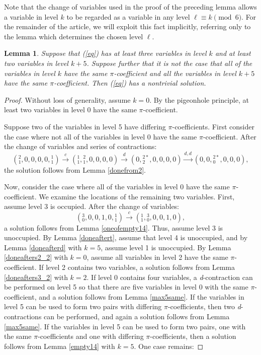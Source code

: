 \documentclass[draft]{publmathdeb}
\newtheorem{lemma}{Lemma}
\begin{document}
Note that the change of variables used in the proof of the preceding lemma allows a variable in level $k$ to be regarded as a variable in any level $\ell \equiv k \pmod{6}$.  For the remainder of the article, we will exploit this fact implicitly, referring only to the lemma which determines the chosen level $\ell$.

\begin{lemma}\label{3and2same}
Suppose that (\ref{eq}) has at least three variables in level $k$ and at least two variables in level $k+5$.  Suppose further that it is not the case that all of the variables in level $k$ have the same $\pi$-coefficient and all the variables in level $k+5$ have the same $\pi$-coefficient. Then (\ref{eq}) has a nontrivial solution.
\end{lemma}
\begin{proof}

Without loss of generality, assume $k=0$.  By the pigeonhole principle, at least two variables in level 0 have the same $\pi$-coefficient.

Suppose two of the variables in level 5 have differing $\pi$-coefficients. First consider the case where not all of the variables in level 0 have the same $\pi$-coefficient.  After the change of variables and series of contractions:
$$({}^{2}_{1},0,0,0,0,{}^{1}_{1}) \xrightarrow{c} ({}^{1}_{1},{}^{2}_{1},0,0,0,0) \xrightarrow{d} (0,{}^{2*}_{2},0,0,0,0) \xrightarrow{d,d} (0,0,{}^{2*}_{0},0,0,0),$$
the solution follows from Lemma \ref{donefrom2}.

Now, consider the case where all of the variables in level 0 have the same $\pi$-coefficient.  We examine the locations of the remaining two variables.  First, assume level 3 is occupied.  After the change of variables:
$$({}^{3}_{0},0,0,1,0,{}^{1}_{1}) \xrightarrow{c} ({}^{1}_{1},{}^{3}_{0},0,0,1,0),$$
a solution follows from Lemma \ref{oneofempty14}.  Thus, assume level 3 is unoccupied.  By Lemma \ref{doneaftert}, assume that level 4 is unoccupied, and by Lemma \ref{doneafterd} with $k=5$, assume level 1 is unoccupied.  By Lemma \ref{doneafters2_2} with $k=0$, assume all variables in level 2 have the same $\pi$-coefficient.  If level 2 contains two variables, a solution follows from Lemma \ref{doneafters3_2} with $k=2$.  If level 0 contains four variables, a \textit{d}-contraction can be performed on level 5 so that there are five variables in level 0 with the same $\pi$-coefficient, and a solution follows from Lemma \ref{max5same}.  If the variables in level 5 can be used to form two pairs with differing $\pi$-coefficients, then two \textit{d}-contractions can be performed, and again a solution follows from Lemma \ref{max5same}.  If the variables in level 5 can be used to form two pairs, one with the same $\pi$-coefficients and one with differing $\pi$-coefficients, then a solution follows from Lemma  \ref{empty14} with $k=5$.  One case remains:


\end{proof}
\end{document}

